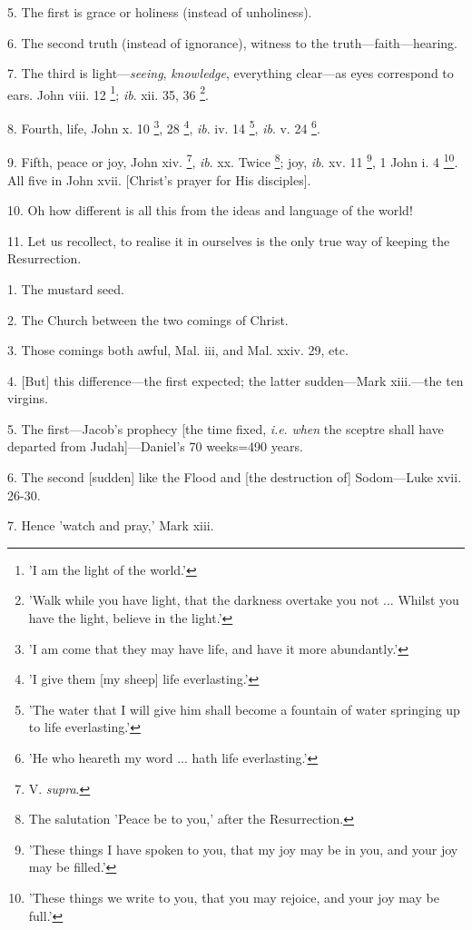 5. The first is grace or holiness (instead of
unholiness).

6. The second truth (instead of ignorance),
witness to the truth—faith—hearing.

7. The third is light—\emph{seeing}, \emph{knowledge},
everything clear—as eyes correspond to ears. John viii. 12 \footnote{'I am the light of the
world.'}; \emph{ib}. xii. 35, 36 \footnote{'Walk while you have
light, that the darkness overtake you not ... Whilst you have the
light, believe in the light.'}.

8. Fourth, life, John x. 10 \footnote{'I am come that they may
have life, and have it more abundantly.'}, 28 \footnote{'I give them [my sheep]
life everlasting.'}, \emph{ib}.
iv. 14 \footnote{'The water that I will
give him shall become a fountain of water springing up to life
everlasting.'}, \emph{ib}. v.
24 \footnote{'He who heareth my word
... hath life everlasting.'}.

9. Fifth, peace or joy, John xiv. \footnote{V. \emph{supra}.}, \emph{ib}. xx. Twice \footnote{The salutation 'Peace be
to you,' after the Resurrection.}; joy, \emph{ib}. xv. 11 \footnote{'These things I have
spoken to you, that my joy may be in you, and your joy may be filled.'}, 1 John i. 4 \footnote{'These things we write
to you, that you may rejoice, and your joy may be full.'}.
All five in John xvii. [Christ's prayer for His disciples].

10. Oh how different is all this from the ideas
and language of the world!

11. Let us recollect, to realise it in ourselves
is the only true way of keeping the Resurrection.


1. The mustard seed.

2. The Church between the two comings of Christ.

3. Those comings both awful, Mal. iii, and Mal.
xxiv. 29, etc.

4. [But] this difference—the first expected;
the latter sudden—Mark xiii.—the ten virgins.

5. The first—Jacob's prophecy [the time fixed, \emph{i.e}.
\emph{when} the sceptre shall have departed from Judah]—Daniel's 70
weeks=490 years.

6. The second [sudden] like the Flood and [the
destruction of] Sodom—Luke xvii. 26-30.

7. Hence 'watch and pray,' Mark xiii.

